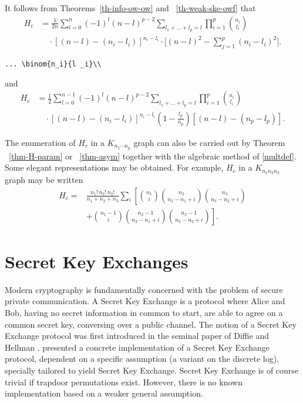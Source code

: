 \documentclass{article}
\theoremstyle{definition}
\theoremstyle{remark}
\begin{document}
It follows from Theorems~\ref{th-info-ow-ow} and
~\ref{th-weak-ske-owf} that
\begin{equation}\label{e:barwq}
\begin{split}
H_c&=\frac1{2n}
\sum^n_{{l}=0}(-1)^{l}(n-{l})^{p-2}
\sum_{l _1+\dots+l _p=l}\prod^p_{i=1}
\binom{n_i}{l _i}\\
&\quad\cdot[(n-l )-(n_i-l _i)]^{n_i-l _i}\cdot
\biggl[(n-l )^2-\sum^p_{j=1}(n_i-l _i)^2\biggr].\end{split}
\end{equation}
\begin{verbatim}
... \binom{n_i}{l _i}\\
\end{verbatim}
and
\begin{equation}\label{joe}
\begin{split}
H_c&=\frac12\sum^{n-1}_{l =0}
(-1)^{l}(n-l )^{p-2}
\sum_{l _1+\dots+l _p=l}
\prod^p_{i=1}\binom{n_i}{l _i}\\
&\quad\cdot[(n-l )-(n_i-l _i)]^{n_i-l _i}
\left(1-\frac{l _p}{n_p}\right)
[(n-l )-(n_p-l _p)].
\end{split}
\end{equation}

The enumeration of $H_c$ in a $K_{n_1\dotsm n_p}$ graph can also be
carried out by Theorem ~\ref{thm-H-param} or ~\ref{thm-asym}
together with the algebraic method of \eqref{multdef}.
Some elegant representations may be obtained. For example, $H_c$ in
a $K_{n_1n_2n_3}$ graph may be written
\begin{equation}\label{j:mark}
\begin{split}
H_c=&
\frac{n_1!\,n_2!\,n_3!}
{n_1+n_2+n_3}\sum_i\left[\binom{n_1}{i}
\binom{n_2}{n_3-n_1+i}\binom{n_3}{n_3-n_2+i}\right.\\
&+\left.\binom{n_1-1}{i}
\binom{n_2-1}{n_3-n_1+i}
\binom{n_3-1}{n_3-n_2+i}\right].\end{split}
\end{equation}

\section{Secret Key Exchanges}
\label{SKE}

Modern cryptography is fundamentally concerned with the problem of
secure private communication.  A Secret Key Exchange is a protocol
where Alice and Bob, having no secret information in common to start,
are able to agree on a common secret key, conversing over a public
channel.  The notion of a Secret Key Exchange protocol was first
introduced in the seminal paper of Diffie and Hellman
\cite{dihe:newdir}. \cite{dihe:newdir} presented a concrete
implementation of a Secret Key Exchange protocol, dependent on a
specific assumption (a variant on the discrete log), specially
tailored to yield Secret Key Exchange. Secret Key Exchange is of
course trivial if trapdoor permutations exist. However, there is no
known implementation based on a weaker general assumption.
\end{document}
